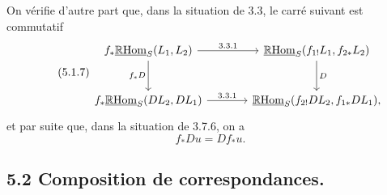 \documentclass[11pt]{article}
\newcommand{\R}{\mathbb{R}}\newcommand{\RHomCore}{\mathbb{R}\mathrm{Hom}}
\providecommand{\RHom}{\RHomCore}
\providecommand{\uRHom}{\underline{\RHom}}
\providecommand{\RHom}{\RHomCore}
\providecommand{\RHom}{\R\mathcal{H}om}
\providecommand{\R}{\mathrm R}
\providecommand{\RHom}{\RHomCore}
\begin{document}
On vérifie d'autre part que, dans la situation de 3.3, le carré suivant est commutatif
\begin{equation}
\tag{5.1.7}
\begin{tikzcd}[column sep=large,row sep=large]
f_*\uRHom_S(L_1,L_2) \arrow[r,"3.3.1"] \arrow[d,"f_*D"']
& \uRHom_S(f_{1!}L_1,f_{2*}L_2) \arrow[d,"D"] \\
f_*\uRHom_S(DL_2,DL_1) \arrow[r,"3.3.1"]
& \uRHom_S(f_{2!}DL_2,f_{1*}DL_1),
\end{tikzcd}
\end{equation}
et par suite que, dans la situation de 3.7.6, on a
\begin{equation}
\tag{5.1.8}
f_*Du=Df_*u.
\end{equation}

\subsection*{5.2 Composition de correspondances.}
\end{document}
